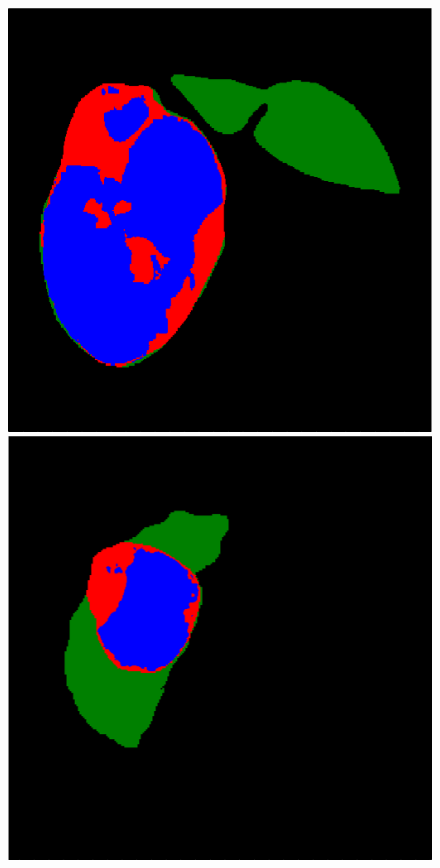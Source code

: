 \begin{figure}[!ht]
\begin{minipage}{4cm}
\end{minipage} \hspace{-0.3cm}
\begin{minipage}{4cm}
\includegraphics*[width=\linewidth]{./images/5_4_gt_resized}
\end{minipage} 
\vspace{-0.2cm}
\begin{minipage}{4cm}
\includegraphics*[width=\linewidth]{./images/1_7_FullAuto_new_resized}

\end{minipage}
\end{figure}
